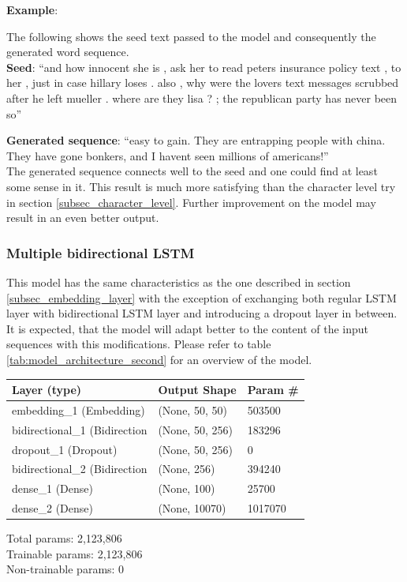\documentclass[conference]{IEEEtran}
\begin{document}
\textbf{Example}:

The following shows the seed text passed to the model and consequently the generated word sequence.\\

\textbf{Seed}: ``and how innocent she is , ask her to read peters insurance policy text , to her , just in case hillary loses . also , why were the lovers text messages scrubbed after he left mueller . where are they lisa ? ; the republican party has never been so''

\textbf{Generated sequence}: ``easy to gain. They are entrapping people with china. They have gone bonkers, and I havent seen millions of americans!''\\

The generated sequence connects well to the seed and one could find at least some sense in it. This result is much more satisfying than the character level try in section \ref{subsec_character_level}. Further improvement on the model may result in an even better output.

\subsubsection{Multiple bidirectional LSTM}\label{subsec_multi_bi_lstm}

This model has the same characteristics as the one described in section \ref{subsec_embedding_layer} with the exception of exchanging both regular LSTM layer with bidirectional LSTM layer and introducing a dropout layer in between. It is expected, that the model will adapt better to the content of the input sequences with this modifications. Please refer to table \ref{tab:model_architecture_second} for an overview of the model.

\begin{center}
\begin{tabular}{l l l}
\hline
Layer (type) & Output Shape & Param \#\\
\hline
\hline
embedding\_1 (Embedding) & (None, 50, 50) & 503500\\
\hline
bidirectional\_1 (Bidirection & (None, 50, 256) & 183296\\
\hline
dropout\_1 (Dropout) & (None, 50, 256) & 0\\
\hline
bidirectional\_2 (Bidirection & (None, 256) & 394240\\
\hline
dense\_1 (Dense) & (None, 100) & 25700\\
\hline
dense\_2 (Dense) & (None, 10070) & 1017070\\
\hline
\hline
\end{tabular}
\begin{flushleft}
Total params: 2,123,806\\
Trainable params: 2,123,806\\
Non-trainable params: 0
\end{flushleft}
\end{center}
\end{document}
